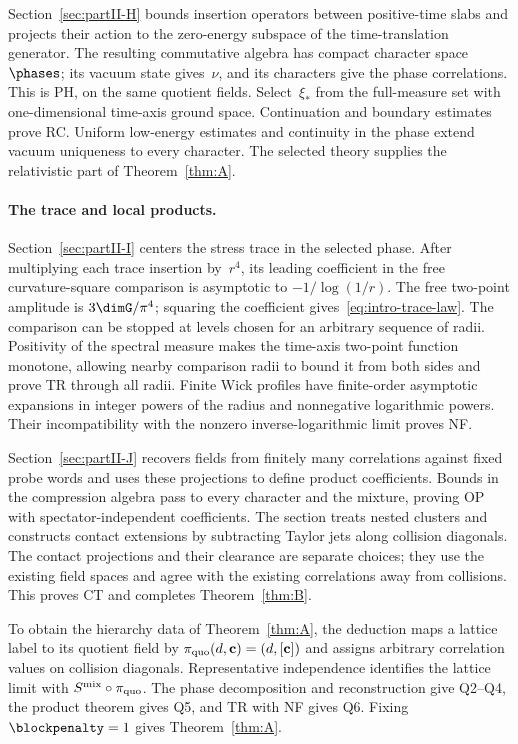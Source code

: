 Section~\ref{sec:partII-H} bounds insertion operators between positive-time slabs and projects their action to the zero-energy subspace of the time-translation generator. The resulting commutative algebra has compact character space~$\phases$; its vacuum state gives~$\nu$, and its characters give the phase correlations. This is PH, on the same quotient fields. Select~$\xi_*$ from the full-measure set with one-dimensional time-axis ground space. Continuation and boundary estimates prove RC. Uniform low-energy estimates and continuity in the phase extend vacuum uniqueness to every character. The selected theory supplies the relativistic part of Theorem~\ref{thm:A}.

\paragraph{The trace and local products.}
Section~\ref{sec:partII-I} centers the stress trace in the selected phase. After multiplying each trace insertion by~$r^4$, its leading coefficient in the free curvature-square comparison is asymptotic to $-1/\log(1/r)$. The free two-point amplitude is $3\dimG/\pi^4$; squaring the coefficient gives~\eqref{eq:intro-trace-law}. The comparison can be stopped at levels chosen for an arbitrary sequence of radii. Positivity of the spectral measure makes the time-axis two-point function monotone, allowing nearby comparison radii to bound it from both sides and prove TR through all radii. Finite Wick profiles have finite-order asymptotic expansions in integer powers of the radius and nonnegative logarithmic powers. Their incompatibility with the nonzero inverse-logarithmic limit proves NF.

Section~\ref{sec:partII-J} recovers fields from finitely many correlations against fixed probe words and uses these projections to define product coefficients. Bounds in the compression algebra pass to every character and the mixture, proving OP with spectator-independent coefficients. The section treats nested clusters and constructs contact extensions by subtracting Taylor jets along collision diagonals. The contact projections and their clearance are separate choices; they use the existing field spaces and agree with the existing correlations away from collisions. This proves CT and completes Theorem~\ref{thm:B}.

To obtain the hierarchy data of Theorem~\ref{thm:A}, the deduction maps a lattice label to its quotient field by $\pi_{\rm quo}(d,\mathbf c)=(d,[\mathbf c])$ and assigns arbitrary correlation values on collision diagonals. Representative independence identifies the lattice limit with $S^{\rm mix}\circ\pi_{\rm quo}$. The phase decomposition and reconstruction give Q2--Q4, the product theorem gives Q5, and TR with NF gives Q6. Fixing~$\blockpenalty=1$ gives Theorem~\ref{thm:A}.

